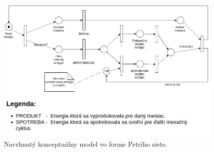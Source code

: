 \documentclass[a4paper, 11pt]{article}
\begin{document}
\begin{figure}[h] 
	\centering
	\includegraphics[width=.8\paperwidth]{petri_net.png}
	\caption{Navrhnutý konceptuálny model vo forme Petriho siete.}
	\label{obr1}
\end{figure} \label{obr_petri_net}

\newpage


\end{document}
